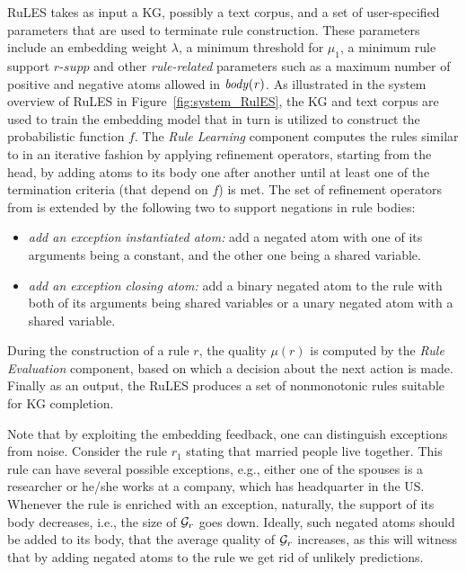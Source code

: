 RuLES takes as input a KG, possibly a text corpus, and a set of user-specified parameters that are used to terminate rule construction.
These parameters include an embedding weight $\lambda$, 
a minimum threshold 
for $\mu_1$,  
a minimum rule support $\textit{r-supp}$ 
and other \emph{rule-related} parameters such as a maximum number of positive %
and negative 
atoms allowed in $\mathit{body(r)}$.
As illustrated in the system overview of RuLES in Figure~\ref{fig:system_RulES}, the KG and text corpus are used to train the embedding model that in turn is utilized to construct the probabilistic function $f$. The \emph{Rule Learning} component 
computes the rules
similar to \cite{amie} in an iterative fashion by applying refinement operators, starting from the head, by adding atoms to its body one after another until at least one of the termination criteria (that depend on $f$) is met. The set of refinement operators from \cite{amie} is extended by the following two to support negations in rule bodies:
\begin{itemize}
\item \emph{add an exception instantiated atom:} add a negated atom with one of its arguments
being a constant, and the other one being a shared variable.
\item \emph{add an exception closing atom:} add a binary negated atom to the rule with both of its
arguments being shared variables or a unary negated atom with a shared variable.
\end{itemize}
 During the construction of a rule $r$, the quality $\mu(r)$ is computed by the \emph{Rule Evaluation} component, based on which a decision about the next action is made.
Finally as an output, the RuLES produces a set of nonmonotonic rules suitable for KG completion.

Note that by exploiting the embedding feedback, one can distinguish
exceptions from noise. Consider the rule $r_1$ stating that married people live together. This
rule can have several possible exceptions, e.g., either one of the spouses is a researcher
or he/she works at a company, which has headquarter in the US. Whenever the rule is
enriched with an exception, naturally, the support of its body decreases, i.e., the size of
$\mathcal{G}_r$ goes down. Ideally, such negated atoms should be added to its body, that the average quality of
$\mathcal{G}_r$ increases, as this will witness that by adding negated atoms to the rule we get rid of
unlikely predictions. 




